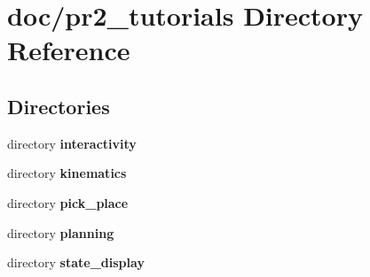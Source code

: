 \section{doc/pr2\-\_\-tutorials Directory Reference}
\label{dir_6fd9e064624e9c682a8b5af31ca6ffed}
\subsection*{Directories}
\begin{DoxyCompactItemize}
\item 
directory {\bf interactivity}
\item 
directory {\bf kinematics}
\item 
directory {\bf pick\-\_\-place}
\item 
directory {\bf planning}
\item 
directory {\bf state\-\_\-display}
\end{DoxyCompactItemize}

